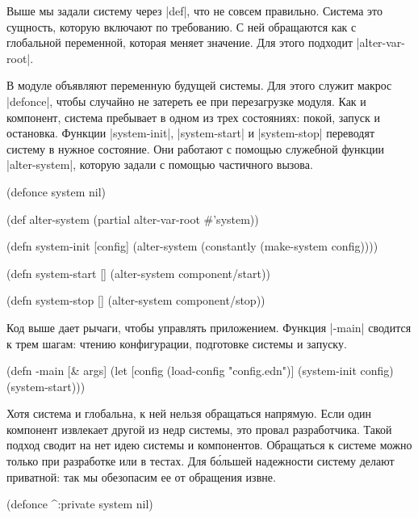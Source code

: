 Выше мы задали систему через \spverb|def|, что не совсем правильно. Система это
сущность, которую включают по требованию. С ней обращаются как с глобальной
переменной, которая меняет значение. Для этого подходит \spverb|alter-var-root|.

В модуле объявляют переменную будущей системы. Для этого служит макрос
\spverb|defonce|, чтобы случайно не затереть ее при перезагрузке модуля. Как и
компонент, система пребывает в одном из трех состояниях: покой, запуск и
остановка. Функции \spverb|system-init|, \spverb|system-start| и
\spverb|system-stop| переводят систему в нужное состояние. Они работают с
помощью служебной функции \spverb|alter-system|, которую задали с помощью
частичного вызова.

\begin{english}
  \begin{clojure}
(defonce system nil)

(def alter-system (partial alter-var-root #'system))

(defn system-init [config]
  (alter-system (constantly (make-system config))))

(defn system-start []
  (alter-system component/start))

(defn system-stop []
  (alter-system component/stop))
  \end{clojure}
\end{english}

Код выше дает рычаги, чтобы управлять приложением. Функция \spverb|-main|
сводится к трем шагам: чтению конфигурации, подготовке системы и запуску.

\begin{english}
  \begin{clojure}
(defn -main [& args]
  (let [config (load-config "config.edn")]
    (system-init config)
    (system-start)))
  \end{clojure}
\end{english}

Хотя система и глобальна, к ней нельзя обращаться напрямую. Если один компонент
извлекает другой из недр системы, это провал разработчика. Такой подход сводит
на нет идею системы и компонентов. Обращаться к системе можно только при
разработке или в тестах. Для б\'{о}льшей надежности систему делают приватной:
так мы обезопасим ее от обращения извне.

\begin{english}
  \begin{clojure}
(defonce ^:private system nil)
  \end{clojure}
\end{english}

